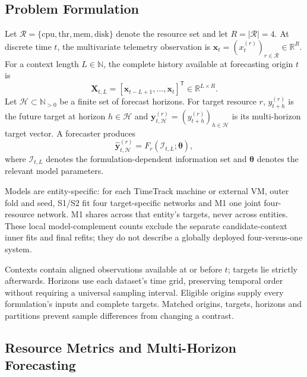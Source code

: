 \documentclass[a4paper,fleqn]{cas-dc}
\begin{document}
\subsection{Problem Formulation}
\label{sec:problem}

Let $\mathcal{R}=\{\mathrm{cpu},\mathrm{thr},\mathrm{mem},\mathrm{disk}\}$
denote the resource set and let $R=|\mathcal{R}|=4$. At discrete time $t$,
the multivariate telemetry observation is
$\mathbf{x}_t=(x_t^{(r)})_{r\in\mathcal{R}}\in\mathbb{R}^{R}$. For a context
length $L\in\mathbb{N}$, the complete history available at forecasting origin
$t$ is
\begin{equation}
  \mathbf{X}_{t,L}
  = [\mathbf{x}_{t-L+1},\ldots,\mathbf{x}_{t}]^{\mathsf T}
  \in \mathbb{R}^{L\times R}.
  \label{eq:multiresource-context}
\end{equation}
Let $\mathcal{H}\subset\mathbb{N}_{>0}$ be a finite set of forecast horizons.
For target resource $r$, $y_{t+h}^{(r)}$ is the future target at horizon
$h\in\mathcal{H}$ and
$\mathbf{y}_{t,\mathcal{H}}^{(r)}=(y_{t+h}^{(r)})_{h\in\mathcal{H}}$ is its
multi-horizon target vector. A forecaster produces
\begin{equation}
  \widehat{\mathbf{y}}_{t,\mathcal{H}}^{(r)}
  = F_r(\mathcal{I}_{t,L};\boldsymbol{\theta}),
  \label{eq:forecasting-task}
\end{equation}
where $\mathcal{I}_{t,L}$ denotes the formulation-dependent information set
and $\boldsymbol{\theta}$ denotes the relevant model parameters.

Models are entity-specific: for each TimeTrack machine or external VM,
outer fold and seed, S1/S2 fit four target-specific networks and M1 one joint
four-resource network. M1 shares across that entity's targets, never across
entities. These local model-complement counts exclude the separate
candidate-context inner fits and final refits; they do not describe a
globally deployed four-versus-one system.

Contexts contain aligned observations available at or before $t$; targets lie
strictly afterwards. Horizons use each dataset's time grid, preserving temporal
order without requiring a universal sampling interval. Eligible origins supply
every formulation's inputs and complete targets. Matched origins, targets,
horizons and partitions prevent sample differences from changing a contrast.

\subsection{Resource Metrics and Multi-Horizon Forecasting}
\label{sec:resource-horizons}
\end{document}
